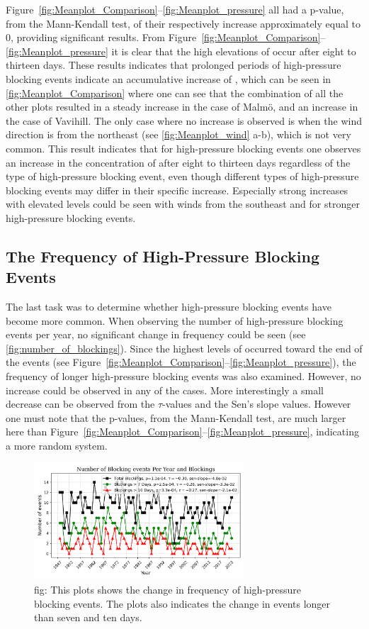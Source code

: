Figure~\ref{fig:Meanplot_Comparison}--\ref{fig:Meanplot_pressure} all had a p-value, from the Mann-Kendall test, of their respectively increase approximately equal to 0, providing significant results. From Figure~\ref{fig:Meanplot_Comparison}--\ref{fig:Meanplot_pressure} it is clear that the high elevations of \PM occur after eight to thirteen days. These results indicates that prolonged periods of high-pressure blocking events indicate an accumulative increase of \PM, which can be seen in \autoref{fig:Meanplot_Comparison} where one can see that the combination of all the other plots resulted in a steady increase in the case of Malmö, and an increase in the case of Vavihill. The only case where no increase is observed is when the wind direction is from the northeast (see \autoref{fig:Meanplot_wind} a-b), which is not very common. This result indicates that for high-pressure blocking events one observes an increase in the concentration of \PM after eight to thirteen days regardless of the type of high-pressure blocking event, even though different types of high-pressure blocking events may differ in their specific increase. Especially strong increases with elevated \PM levels could be seen with winds from the southeast and for stronger high-pressure blocking events. 

\subsection{The Frequency of High-Pressure Blocking Events}
The last task was to determine whether high-pressure blocking events have become more common. When observing the number of high-pressure blocking events per year, no significant change in frequency could be seen (see \autoref{fig:number_of_blockings}). Since the highest levels of \PM  occurred toward the end of the events (see Figure~\ref{fig:Meanplot_Comparison}--\ref{fig:Meanplot_pressure}), the frequency of longer high-pressure blocking events was also examined. However, no increase could be observed in any of the cases. More interestingly a small decrease can be observed from the $\tau$-values and the Sen's slope values. However one must note that the p-values, from the Mann-Kendall test, are much larger here than Figure~\ref{fig:Meanplot_Comparison}--\ref{fig:Meanplot_pressure}, indicating a more random system. 

\begin{figure}[H]
    \centering
    \includegraphics[width=0.7\textwidth]{Figures/BlockingsPerYear.png}
    \caption{fig: This plots shows the change in frequency of high-pressure blocking events. The plots also indicates the change in events longer than seven and ten days. }
    \label{fig:number_of_blockings}
\end{figure}

